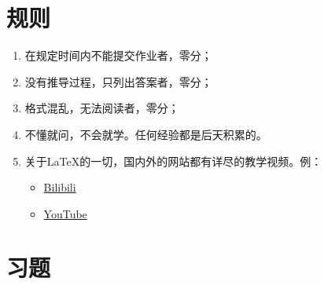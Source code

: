 \documentclass[12pt,hyperref,a4paper,UTF8]{ctexart}
\begin{document}
\cover

%
%

\thispagestyle{empty} %

\newpage
\tableofcontents

\newpage


\section{规则}
\begin{enumerate}[I]
    \item 在规定时间内不能提交作业者，零分；

    \item 没有推导过程，只列出答案者，零分；

    \item 格式混乱，无法阅读者，零分；

    \item 不懂就问，不会就学。任何经验都是后天积累的。

    \item 关于LaTeX的一切，国内外的网站都有详尽的教学视频。例：
    \begin{itemize}
        \item \href{https://www.bilibili.com/video/BV1Jy4y1p76e/?vd_source=2c0f6624843da61e86c7e8a2b75de875}{Bilibili}

        \item \href{https://www.youtube.com/watch?v=Jp0lPj2-DQA&list=PLHXZ9OQGMqxcWWkx2DMnQmj5os2X5ZR73}{YouTube}
    \end{itemize}
\end{enumerate}

\newpage

\section{习题}
\end{document}
